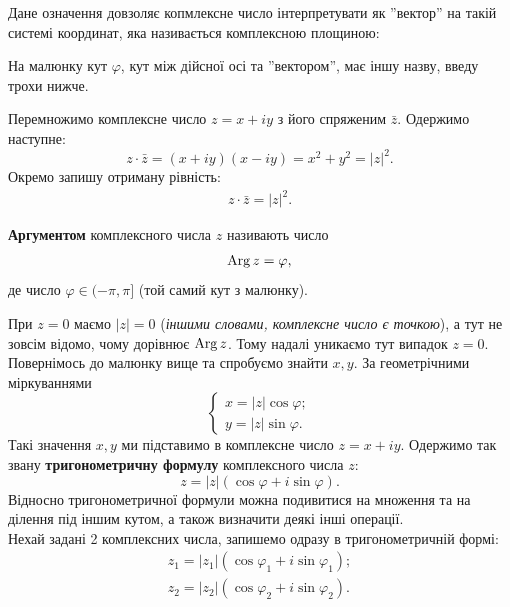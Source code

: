 \documentclass{math_library}
\begin{document}
\begin{remark}
Дане означення довзоляє копмлексне число інтерпретувати як ''вектор'' на такій системі координат, яка називається комплексною площиною:
\begin{figure}[H]
\centering
{}
\end{figure}
На малюнку кут $\varphi$, кут між дійсної осі та ''вектором'', має іншу назву, введу трохи нижче.
\end{remark}

\begin{remark}
Перемножимо комплексне число $z = x+iy$ з його спряженим $\bar{z}$. Одержимо наступне:
\[
z \cdot \bar{z} = (x+iy)(x-iy) = x^2+y^2 = |z|^2.
\]
Окремо запишу отриману рівність:
\begin{align*}
z \cdot \bar{z} = |z|^2.
\end{align*}
\end{remark}

\begin{definition}
\textbf{Аргументом} комплексного числа $z$ називають число
\begin{align*}
\operatorname{Arg} z = \varphi,
\end{align*}
де число $\varphi \in (-\pi,\pi]$ (той самий кут з малюнку).
\end{definition}

При $z = 0$ маємо $|z| = 0$ (\textit{іншими словами, комплексне число є точкою}), а тут не зовсім відомо, чому дорівнює $\operatorname{Arg} z$. Тому надалі уникаємо тут випадок $z = 0$.
\bigskip \\
Повернімось до малюнку вище та спробуємо знайти $x,y$. За геометрічними міркуваннями
\[
\begin{cases}
x = |z| \cos \varphi; \\
y = |z| \sin \varphi.
\end{cases}
\]
Такі значення $x,y$ ми підставимо в комплексне число $z = x + iy$. Одержимо так звану \textbf{тригонометричну формулу} комплексного числа $z$:
\[
z = |z|(\cos \varphi + i \sin \varphi).
\]
Відносно тригонометричної формули можна подивитися на множення та на ділення під іншим кутом, а також визначити деякі інші операції.\\
Нехай задані 2 комплексних числа, запишемо одразу в тригонометричній формі:
\begin{align*}
z_1 = |z_1| (\cos \varphi_1 + i \sin \varphi_1); \\
z_2 = |z_2| (\cos \varphi_2 + i \sin \varphi_2).
\end{align*}
\end{document}
